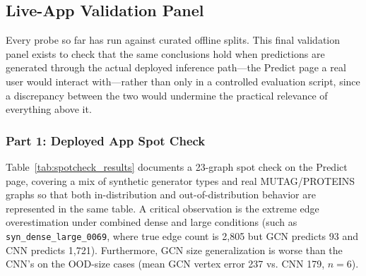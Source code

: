 \documentclass[11pt,letterpaper]{article}
\numberwithin{equation}{section}
\numberwithin{figure}{section}
\numberwithin{table}{section}
\begin{document}
\subsection{Live-App Validation Panel}
Every probe so far has run against curated offline splits. This final validation panel exists to check that the same conclusions hold when predictions are generated through the actual deployed inference path---the Predict page a real user would interact with---rather than only in a controlled evaluation script, since a discrepancy between the two would undermine the practical relevance of everything above it.

\subsubsection{Part 1: Deployed App Spot Check}
Table~\ref{tab:spotcheck_results} documents a 23-graph spot check on the Predict page, covering a mix of synthetic generator types and real MUTAG/PROTEINS graphs so that both in-distribution and out-of-distribution behavior are represented in the same table.
A critical observation is the extreme edge overestimation under combined dense and large conditions (such as \texttt{syn\_dense\_large\_0069}, where true edge count is 2,805 but GCN predicts 93 and CNN predicts 1,721). Furthermore, GCN size generalization is worse than the CNN's on the OOD-size cases (mean GCN vertex error 237 vs. CNN 179, $n=6$).
\end{document}
